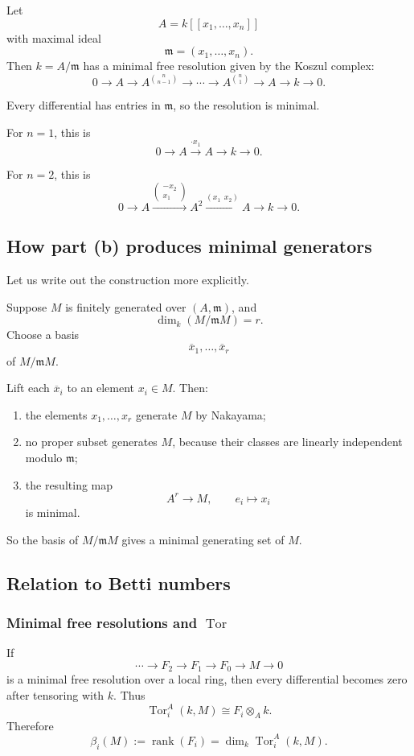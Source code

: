 \documentclass[12pt,a4paper]{article}
\theoremstyle{notespace}
\DeclareMathOperator{\Tor}{Tor}
\newcommand{\rank}{\operatorname{rank}}
\newcommand{\m}{\mathfrak m}
\begin{document}
Let
\[
A=k[[x_1,\dots,x_n]]
\]
with maximal ideal
\[
\m=(x_1,\dots,x_n).
\]
Then \(k=A/\m\) has a minimal free resolution given by the Koszul complex:
\[
0\to A \to A^{\binom{n}{n-1}} \to \cdots \to A^{\binom{n}{1}} \to A \to k \to 0.
\]

Every differential has entries in \(\m\), so the resolution is minimal.

For \(n=1\), this is
\[
0\to A \xrightarrow{\cdot x_1} A \to k \to 0.
\]

For \(n=2\), this is
\[
0\to A \xrightarrow{\begin{pmatrix}-x_2\\x_1\end{pmatrix}} A^2
\xrightarrow{(x_1\ \ x_2)} A \to k \to 0.
\]

\subsection{How part (b) produces minimal generators}

Let us write out the construction more explicitly.

Suppose \(M\) is finitely generated over \((A,\m)\), and
\[
\dim_k(M/\m M)=r.
\]
Choose a basis
\[
\overline x_1,\dots,\overline x_r
\]
of \(M/\m M\).

Lift each \(\overline x_i\) to an element \(x_i\in M\). Then:
\begin{enumerate}[leftmargin=2em]
	\item the elements \(x_1,\dots,x_r\) generate \(M\) by Nakayama;
	\item no proper subset generates \(M\), because their classes are linearly independent modulo \(\m\);
	\item the resulting map
	\[
	A^r\to M,\qquad e_i\mapsto x_i
	\]
	is minimal.
\end{enumerate}

So the basis of \(M/\m M\) gives a minimal generating set of \(M\).

\subsection{Relation to Betti numbers}

\subsubsection{Minimal free resolutions and \(\Tor\)}

If
\[
\cdots \to F_2\to F_1\to F_0\to M\to 0
\]
is a minimal free resolution over a local ring, then every differential becomes zero after tensoring with \(k\). Thus
\[
\Tor_i^A(k,M)\cong F_i\otimes_A k.
\]
Therefore
\[
\beta_i(M):=\rank(F_i)=\dim_k \Tor_i^A(k,M).
\]
\end{document}
